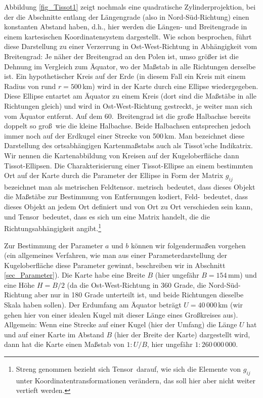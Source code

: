 Abbildung \ref{fig_Tissot1} zeigt nochmals eine quadratische Zylinderprojektion, bei der die
Abschnitte entlang der L\"angengrade (also in Nord-S\"ud-Richtung)
einen konstanten Abstand haben, d.h., hier werden
die L\"angen- und Breitengrade in einem kartesischen Koordinatensystem dargestellt. 
Wie schon besprochen, f\"uhrt diese Darstellung zu einer Verzerrung in Ost-West-Richtung
in Abh\"angigkeit vom Breitengrad: Je n\"aher der Breitengrad an den Polen ist, umso
gr\"o\ss er ist die Dehnung im Vergleich zum \"Aquator, wo der Ma\ss stab in alle Richtungen
derselbe ist. Ein hypothetischer Kreis auf der Erde (in diesem Fall ein Kreis mit einem 
Radius von rund $r=500$\,km) wird in der Karte durch eine Ellipse wiedergegeben. Diese
Ellipse entartet am \"Aquator zu einem Kreis (dort sind die Ma\ss st\"abe in alle
Richtungen gleich) und wird in Ost-West-Richtung gestreckt, je weiter man sich vom 
\"Aquator entfernt. Auf dem 60.\ Breitengrad ist die gro\ss e Halbachse bereits doppelt so gro\ss\
wie die kleine Halbachse. Beide Halbachsen entsprechen jedoch immer noch auf der
Erdkugel einer Strecke von 500\,km. Man bezeichnet diese Darstellung des ortsabh\"angigen
Kartenma\ss stabs auch als Tissot'sche Indikatrix. Wir nennen die Kartenabbildung von Kreisen auf der
Kugeloberfl\"ache dann Tissot-Ellipsen.\index{Tissot-Ellipse} 
Die Charakterisierung einer Tissot-Ellipse an einem
bestimmten Ort auf der Karte durch die Parameter der Ellipse in Form der Matrix $g_{ij}$
bezeichnet man als metrischen Feldtensor.\index{Feldtensor, metrischer} 
\glqq metrisch\grqq\ bedeutet, dass dieses
Objekt die Ma\ss st\"abe zur Bestimmung von Entfernungen kodiert, \glqq Feld-\grqq\ bedeutet,
dass dieses Objekt an jedem Ort definiert und von Ort zu Ort verschieden sein kann, und 
\glqq Tensor\grqq\ bedeutet, dass es sich um eine Matrix handelt, die die Richtungsabh\"angigkeit
angibt.\footnote{Streng genommen bezieht sich \glqq Tensor\grqq\ darauf, wie sich die Elemente von
$g_{ij}$ unter Koordinatentransformationen ver\"andern, das soll hier aber nicht weiter
vertieft werden.} 

Zur Bestimmung der Parameter $a$ und $b$ k\"onnen wir folgenderma\ss en vorgehen (ein
allgemeines Verfahren, wie man aus einer Parameterdarstellung der Kugeloberfl\"ache diese
Parameter gewinnt, beschreiben wir
in Abschnitt \ref{sec_Parameter}). Die Karte habe eine Breite $B$ (hier ungef\"ahr $B=154$\,mm)
und eine H\"ohe $H=B/2$ (da die Ost-West-Richtung in 360 Grade, die Nord-S\"ud-Richtung
aber nur in 180 Grade unterteilt ist, und beide Richtungen dieselbe Skala haben sollen). 
Der Erdumfang am \"Aquator betr\"agt $U=40\,000$\,km 
(wir gehen hier von einer idealen Kugel mit dieser L\"ange eines Gro\ss kreises aus).
Allgemein: Wenn eine Strecke auf einer Kugel (hier der Umfang) die L\"ange $U$ hat und auf einer Karte 
im Abstand $B$ (hier der Breite der Karte) dargestellt wird, 
dann hat die Karte einen Ma\ss stab von $1:U/B$, hier ungef\"ahr $1:260\,000\,000$.  

